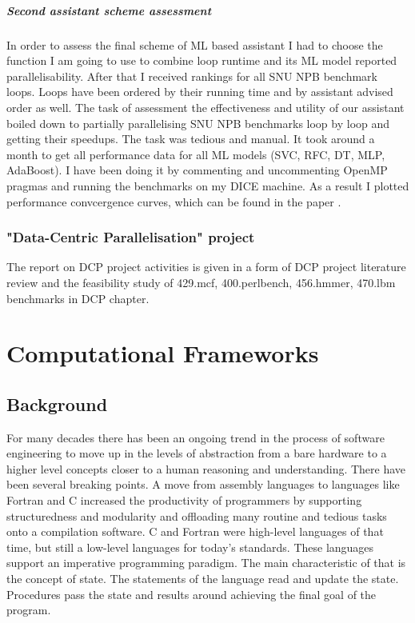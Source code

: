 \documentclass[10pt,a4paper]{report}
\begin{document}
\paragraph{Second assistant scheme assessment}
\quad In order to assess the final scheme of ML based assistant I had to choose the function I am going to use to combine loop runtime and its ML model reported parallelisability. After that I received rankings for all SNU NPB benchmark loops. Loops have been ordered by their running time and by assistant advised order as well. The task of assessment the effectiveness and utility of our assistant boiled down to partially parallelising SNU NPB benchmarks loop by loop and getting their speedups. The task was tedious and manual. It took around a month to get all performance data for all ML models (SVC, RFC, DT, MLP, AdaBoost). I have been doing it by commenting and uncommenting OpenMP pragmas and running the benchmarks on my DICE machine. As a result I plotted performance convcergence curves, which can be found in the paper \cite{aiseps}.  

\subsection{"Data-Centric Parallelisation" project}
\quad The report on DCP project activities is given in a form of DCP project literature review and the feasibility study of 429.mcf, 400.perlbench, 456.hmmer, 470.lbm benchmarks in DCP chapter.




\chapter{Computational Frameworks}

\section{Background}
\quad For many decades there has been an ongoing trend in the process of software engineering to move up in the levels of abstraction from a bare hardware to a higher level concepts closer to a human reasoning and understanding. There have been several breaking points. A move from assembly languages to languages like Fortran and C increased the productivity of programmers by supporting structuredness and modularity and offloading many routine and tedious tasks onto a compilation software. C and Fortran were high-level languages of that time, but still a low-level languages for today's standards. These languages support an imperative programming paradigm. The main characteristic of that is the concept of state. The statements of the language read and update the state. Procedures pass the state and results around achieving the final goal of the program.   
\end{document}
